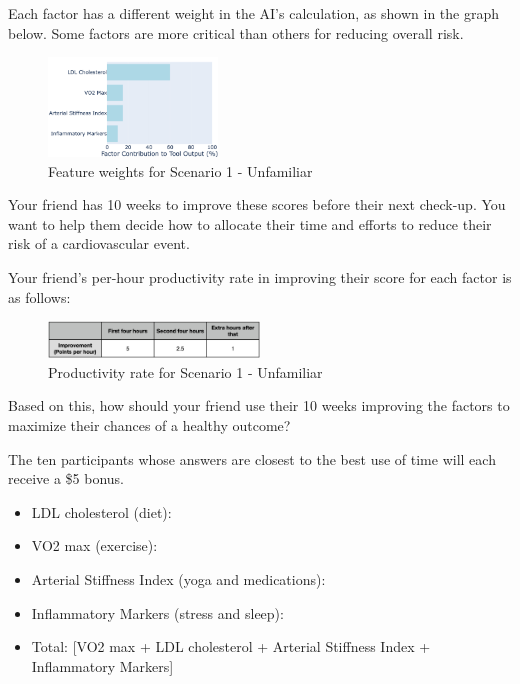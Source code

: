 Each factor has a different weight in the AI’s calculation, as shown in the graph below. Some factors are more critical than others for reducing overall risk.
\begin{figure}[ht]
    \centering
    \includegraphics[width=0.4\textwidth]{Figures/4_unf_unbal.png}
    \caption{Feature weights for Scenario 1 - Unfamiliar}
    \label{fig:survey-weights-scenario1-unf}
\end{figure}

Your friend has 10 weeks to improve these scores before their next check-up. You want to help them decide how to allocate their time and efforts to reduce their risk of a cardiovascular event.

Your friend’s per-hour productivity rate in improving their score for each factor is as follows:

\begin{figure}[ht]
    \centering
    \includegraphics[width=0.5\textwidth]{Figures/rate-unf.png}
    \caption{Productivity rate for Scenario 1 - Unfamiliar}
    \label{fig:survey-cost-scenario1-unf}
\end{figure}

Based on this, how should your friend use their 10 weeks improving the factors to maximize their chances of a healthy outcome?

The ten participants whose answers are closest to the best use of time will each receive a \$5 bonus. 

\begin{itemize}
    \item LDL cholesterol (diet): \underline{\hspace{2cm}}
    \item VO2 max (exercise): \underline{\hspace{2cm}}
    \item Arterial Stiffness Index (yoga and medications): \underline{\hspace{2cm}}
    \item Inflammatory Markers (stress and sleep): \underline{\hspace{2cm}}
    \item Total: [VO2 max + LDL cholesterol + Arterial Stiffness Index + Inflammatory Markers]
\end{itemize}


